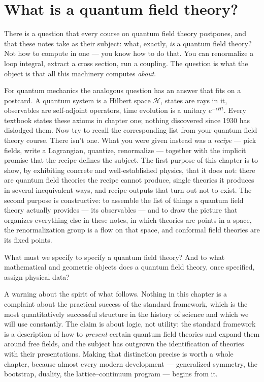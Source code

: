 \section{What is a quantum field theory?}
\label{ch:what-is-qft}

There is a question that every course on quantum field theory postpones, and
that these notes take as their subject: what, exactly, \emph{is} a quantum field
theory? Not how to compute in one --- you know how to do that. You can
renormalize a loop integral, extract a cross section, run a coupling. The
question is what the object is that all this machinery computes \emph{about}.

For quantum mechanics the analogous question has an answer that fits on a
postcard. A quantum system is a Hilbert space $\mathcal{H}$, states are rays in
it, observables are self-adjoint operators, time evolution is a unitary
$e^{-iHt}$. Every textbook states these axioms in chapter one; nothing
discovered since 1930 has dislodged them. Now try to recall the corresponding
list from your quantum field theory course. There isn't one. What you were given
instead was a \emph{recipe} --- pick fields, write a Lagrangian, quantize,
renormalize --- together with the implicit promise that the recipe defines the
subject. The first purpose of this chapter is to show, by exhibiting concrete
and well-established physics, that it does not: there are quantum field theories
the recipe cannot produce, single theories it produces in several inequivalent
ways, and recipe-outputs that turn out not to exist. The second purpose is
constructive: to assemble the list of things a quantum field theory actually
provides --- its observables --- and to draw the picture that organizes
everything else in these notes, in which theories are points in a space, the
renormalization group is a flow on that space, and conformal field theories are
its fixed points.

\begin{qquestion}
What must we specify to specify a quantum field theory? And to what mathematical
and geometric objects does a quantum field theory, once specified, assign
physical data?
\end{qquestion}

\noin A warning about the spirit of what follows. Nothing in this chapter is a
complaint about the practical success of the standard framework, which is
the most quantitatively successful structure in the history of science and
which we will use constantly. The claim is about logic, not utility: the
standard framework is a description of how to \emph{present} certain
quantum field theories and expand them around free fields, and the subject
has outgrown the identification of theories with their presentations.
Making that distinction precise is worth a whole chapter, because almost
every modern development --- generalized symmetry, the bootstrap, duality,
the lattice--continuum program --- begins from it.

